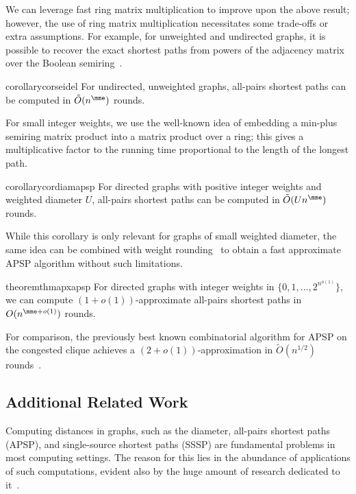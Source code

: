 We can leverage fast ring matrix multiplication to improve upon the above result; however, the use of ring matrix multiplication necessitates some trade-offs or extra assumptions. For example, for unweighted and undirected graphs, it is possible to recover the exact shortest paths from powers of the adjacency matrix over the Boolean semiring~\cite{Seidel1995400}.

\begin{restatable}{corollary}{corseidel}
For undirected, unweighted graphs, all-pairs shortest paths can be computed in $\tilde{O}(n^{\mme})$ rounds.
\end{restatable}

For small integer weights, we use the well-known idea of embedding a min-plus semiring matrix product into a matrix product over a ring; this gives a multiplicative factor to the running time proportional to the length of the longest path.

\begin{restatable}{corollary}{cordiamapsp}
For directed graphs with positive integer weights and weighted diameter $U$, all-pairs shortest paths can be computed in $\tilde{O}(U n^{\mme})$ rounds.
\end{restatable}

While this corollary is only relevant for graphs of small weighted diameter, the same idea can be combined with weight rounding~\cite{raghavan85,zwick2002all,nanongkai14} to obtain a fast approximate APSP algorithm without such limitations.

\begin{restatable}{theorem}{thmapxapsp}
For directed graphs with integer weights in $\{0,1,\ldots,2^{n^{o(1)}}\}$, we can compute $(1 + o(1))$-approximate all-pairs shortest paths in $O(n^{\mme + o(1)})$ rounds.
\end{restatable}

For comparison, the previously best known combinatorial algorithm for APSP on the congested clique achieves a $(2+o(1))$-approximation in $\tilde{O}(n^{1/2})$ rounds~\cite{nanongkai14}.

\subsection{Additional Related Work}\label{sec:related-work}
Computing distances in graphs,
such as the diameter, all-pairs shortest paths (APSP), and single-source shortest paths (SSSP)
are fundamental problems in most computing settings.
The reason for this lies in the abundance of applications of such computations, evident also by the huge amount of research dedicated to it~\cite{Chan10_apsp,HanT12_apsp,
Han08_apsp,Takaoka04_apsp,Zwick06_APSP,Takaoka05_apsp,Chan08_apsp,Fredman76_apsp,
williams2014apsp,
Zwick01_graph_distances_survey,zwick2002all}.

